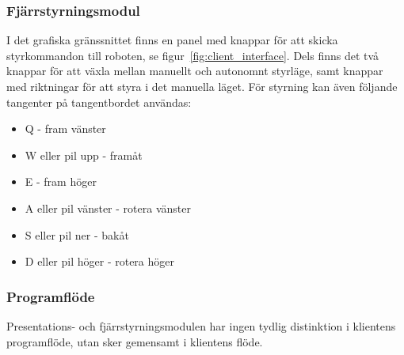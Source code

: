 \documentclass{article}
\begin{document}
\subsubsection{Fjärrstyrningsmodul}
I det grafiska gränssnittet finns en panel med knappar för att skicka styrkommandon till roboten, se figur~\ref{fig:client_interface}. Dels finns det två knappar för att växla mellan manuellt och autonomnt styrläge, samt knappar med riktningar för att styra i det manuella läget. För styrning kan även följande tangenter på tangentbordet användas:
\begin{itemize}
    \item Q - fram vänster
    \item W eller pil upp - framåt
    \item E - fram höger
    \item A eller pil vänster - rotera vänster
    \item S eller pil ner - bakåt
    \item D eller pil höger - rotera höger
\end{itemize}

\subsubsection{Programflöde}
Presentations- och fjärrstyrningsmodulen har ingen tydlig distinktion i klientens programflöde, utan sker gemensamt i klientens flöde.
\end{document}

